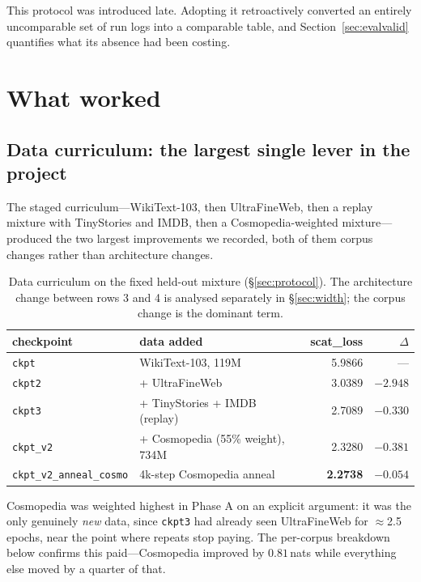 \documentclass[11pt,a4paper]{article}
\newcommand{\nats}[1]{\ensuremath{#1}\,nats}
\begin{document}
This protocol was introduced late. Adopting it retroactively converted an entirely
uncomparable set of run logs into a comparable table, and Section~\ref{sec:evalvalid} quantifies
what its absence had been costing.

\section{What worked}\label{sec:worked}

\subsection{Data curriculum: the largest single lever in the project}

The staged curriculum---WikiText-103, then UltraFineWeb, then a replay mixture with
TinyStories and IMDB, then a Cosmopedia-weighted mixture---produced the two largest
improvements we recorded, both of them corpus changes rather than architecture changes.

\begin{table}[H]
\centering\small
\begin{tabular}{llrr}
\toprule
checkpoint & data added & scat\_loss & $\Delta$ \\
\midrule
\texttt{ckpt}   & WikiText-103, 119M          & 5.9866 & --- \\
\texttt{ckpt2}  & + UltraFineWeb              & 3.0389 & $-2.948$ \\
\texttt{ckpt3}  & + TinyStories + IMDB (replay) & 2.7089 & $-0.330$ \\
\texttt{ckpt\_v2} & + Cosmopedia (55\% weight), 734M & 2.3280 & $-0.381$ \\
\texttt{ckpt\_v2\_anneal\_cosmo} & 4k-step Cosmopedia anneal & \textbf{2.2738} & $-0.054$ \\
\bottomrule
\end{tabular}
\caption{Data curriculum on the fixed held-out mixture (\S\ref{sec:protocol}). The architecture
change between rows 3 and 4 is analysed separately in \S\ref{sec:width}; the corpus change is
the dominant term.}
\end{table}

Cosmopedia was weighted highest in Phase A on an explicit argument: it was the only genuinely
\emph{new} data, since \texttt{ckpt3} had already seen UltraFineWeb for $\approx$2.5 epochs,
near the point where repeats stop paying. The per-corpus breakdown below confirms this
paid---Cosmopedia improved by \nats{0.81} while everything else moved by a quarter of that.
\end{document}
